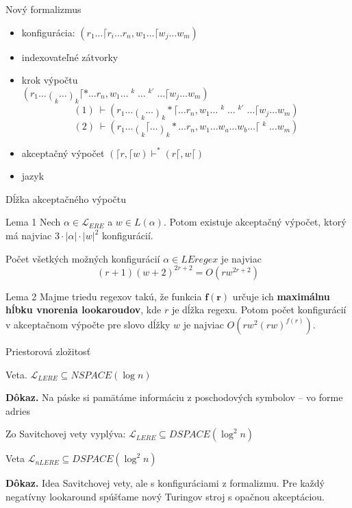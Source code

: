 \documentclass[mathserif]{beamer}
\def\le{LEregex}
\def\el{\mathscr{L}_{ERE}}
\def\lel{\mathscr{L}_{LERE}}
\def\nlel{\mathscr{L}_{nLERE}}
\begin{document}
\begin{frame}{Nový formalizmus}
\begin{itemize}
\item konfigurácia: $(r_1\dots \lceil r_i\dots r_n,w_1 \dots \lceil w_j \dots w_m)$
\item indexovateľné zátvorky
\item krok výpočtu 
\\ \vspace{5pt} $\displaystyle{(r_1 \dots \mathop{(}_k \dots \mathop{)}_k\lceil * \dots r_n, w_1 \dots \mathop{w_a}^k \dots \mathop{w_b}^{k'} \dots \lceil w_j \dots w_m)}$
$$(1) ~\vdash(r_1 \dots \mathop{(}_k \dots \mathop{)}_k *\lceil \dots r_n, w_1 \dots \mathop{w_a}^k \dots \mathop{w_b}^{k'} \dots \lceil w_j \dots w_m)$$
$$(2) ~\vdash(r_1 \dots \mathop{(}_k\lceil \dots \mathop{)}_k * \dots r_n, w_1 \dots w_a \dots w_b \dots \lceil \mathop{w_j}^k \dots w_m)$$
\item akceptačný výpočet $(\lceil r, \lceil w)\vdash^* (r \lceil, w \lceil)$
\item jazyk
\end{itemize}
\end{frame}

\begin{frame}{Dĺžka akceptačného výpočtu}
\begin{block}{Lema 1}
Nech $\alpha \in \el$ a $w \in L(\alpha)$. Potom existuje akceptačný výpočet, ktorý má najviac $3\cdot|\alpha|\cdot|w|^2$ konfigurácií.
\end{block}

\vspace{20pt}
Počet všetkých možných konfigurácií $\alpha\in\le$ je najviac
$$ (r+1)(w+2)^{2r+2} = O(rw^{2r+2})$$

\begin{block}{Lema 2}
Majme triedu regexov takú, že funkcia $\bm{f(r)}$ určuje ich \textbf{maximálnu hĺbku vnorenia lookaroudov}, kde $r$ je dĺžka regexu. Potom počet konfigurácií v akceptačnom výpočte pre slovo dĺžky $w$ je najviac $O(rw^2(rw)^{f(r)})$.
\end{block}
\end{frame}

\begin{frame}{Priestorová zložitosť}
\begin{block}{Veta.}
$\lel \subseteq NSPACE(\log n)$
\end{block}
\textbf{Dôkaz.} Na páske si pamätáme informáciu z poschodových symbolov -- vo forme adries

\vspace{10pt}
Zo Savitchovej vety vyplýva: $\lel \subseteq DSPACE(\log^2 n)$
\begin{block}{Veta}
$\nlel \subseteq DSPACE(\log^2 n)$
\end{block}
\textbf{Dôkaz.} Idea Savitchovej vety, ale s konfiguráciami z formalizmu. Pre každý negatívny lookaround spúšťame nový Turingov stroj s opačnou akceptáciou.
\end{frame}
\end{document}
